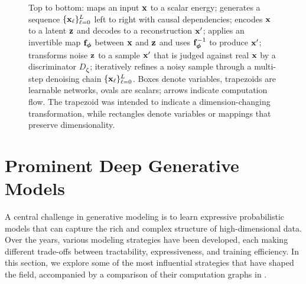\begin{figure}[th!]
{}%
\vspace{1.0cm}
\caption{ Top to bottom:  maps an input ${\mathbf{x}}$ to a scalar energy;  generates a sequence $\{{\mathbf{x}}_\ell\}_{\ell=0}^{L}$ left to right with causal dependencies;  encodes ${\mathbf{x}}$ to a latent ${\mathbf{z}}$ and decodes to a reconstruction ${\mathbf{x}}'$;  applies an invertible map ${\mathbf{f}}_{\bm{\phi}}$ between ${\mathbf{x}}$ and ${\mathbf{z}}$ and uses ${\mathbf{f}}_{\bm{\phi}}^{-1}$ to produce ${\mathbf{x}}'$;  transforms noise ${\mathbf{z}}$ to a sample ${\mathbf{x}}'$ that is judged against real ${\mathbf{x}}$ by a discriminator $D_{\bm\zeta}$;  iteratively refines a noisy sample through a multi-step denoising chain $\{{\mathbf{x}}_\ell\}_{\ell=0}^{L}$. Boxes denote variables, trapezoids are learnable networks, ovals are scalars; arrows indicate computation flow. The trapezoid was intended to indicate a dimension-changing transformation, while rectangles denote variables or mappings that preserve dimensionality. }
\label{fig:ebm-ar-vae-nf-gan-dm-unified}
\end{figure}
\newpage

\section{Prominent Deep Generative Models}\label{sec:examples-dgm}





A central challenge in generative modeling is to learn expressive probabilistic models that can capture the rich and complex structure of high-dimensional data. Over the years, various modeling strategies have been developed, each making different trade-offs between tractability, expressiveness, and training efficiency. In this section, we explore some of the most influential strategies that have
shaped the field, accompanied by a comparison of their computation graphs in
.



